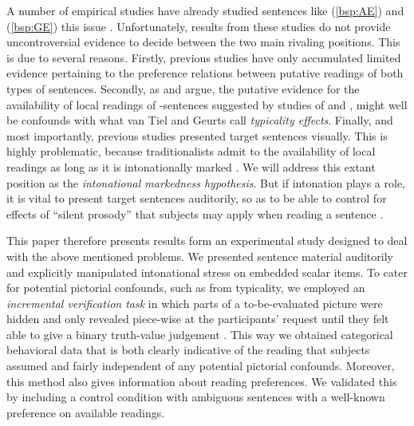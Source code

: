 \documentclass[fleqn,reqno,10pt,draft]{article}
\newcommand{\as}{\acro{as}}
\begin{document}
A number of empirical studies have already studied sentences like
(\ref{bsp:AE}) and (\ref{bsp:GE}) this issue
\citep[e.g.][]{GeurtsPouscoulous2009:Embedded-Implic,CliftonDube2010:Embedded-Implic,ChemlaSpector2010:Experimental-Ev}. Unfortunately,
results from these studies do not provide uncontroversial evidence to
decide between the two main rivaling positions. This is due to several
reasons. Firstly, previous studies have only accumulated limited
evidence pertaining to the preference relations between putative
readings of both types of sentences. Secondly, as
\citet{Tielvan-Tiel2012:Embedded-Scalar} and
\citet{GeurtsTielvan-Tiel2013:Scalar-expressi} argue, the putative
evidence for the availability of local readings of \as-sentences
suggested by studies of \citet{CliftonDube2010:Embedded-Implic} and
\citet{ChemlaSpector2010:Experimental-Ev}, might well be confounds
with what van Tiel and Geurts call \emph{typicality effects}. Finally,
and most importantly, previous studies presented target sentences
visually. This is highly problematic, because traditionalists admit to
the availability of local readings as long as it is intonationally
marked
\citep[e.g.][]{Horn2006:The-Border-Wars,Geurts2009:Scalar-Implicat,ChemlaSpector2010:Experimental-Ev,Geurts2010:Quantity-Implic,Tielvan-Tiel2012:Embedded-Scalar,GeurtsTielvan-Tiel2013:Scalar-expressi}. We
will address this extant position as the \emph{intonational markedness
  hypothesis}. But if intonation plays a role, it is vital to present
target sentences auditorily, so as to be able to control for effects
of ``silent prosody'' that subjects may apply when reading a sentence
\citep[see][]{Bader98,Fodor98}.

This paper therefore presents results form an experimental study
designed to deal with the above mentioned problems. We presented
sentence material auditorily and explicitly manipulated intonational
stress on embedded scalar items. To cater for potential pictorial
confounds, such as from typicality, we employed an \emph{incremental
  verification task} in which parts of a to-be-evaluated picture were
hidden and only revealed piece-wise at the participants' request until
they felt able to give a binary truth-value judgement
\citep[see][]{Conroy2008}. This way we obtained categorical behavioral
data that is both clearly indicative of the reading that subjects
assumed and fairly independent of any potential pictorial
confounds. Moreover, this method also gives information about reading
preferences. We validated this by including a control condition with
ambiguous sentences with a well-known preference on available
readings.
\end{document}
